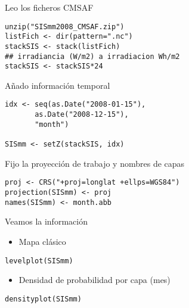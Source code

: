 \documentclass[xcolor={usenames,svgnames,dvipsnames}]{beamer}
\begin{document}
\begin{frame}[fragile,label=sec-2-1]{Leo los ficheros CMSAF}
 \lstset{language=R,numbers=none}
\begin{lstlisting}
unzip("SISmm2008_CMSAF.zip")
listFich <- dir(pattern=".nc")
stackSIS <- stack(listFich)
## irradiancia (W/m2) a irradiacion Wh/m2
stackSIS <- stackSIS*24
\end{lstlisting}
\end{frame}
\begin{frame}[fragile,label=sec-2-2]{Añado información temporal}
 \lstset{language=R,numbers=none}
\begin{lstlisting}
idx <- seq(as.Date("2008-01-15"),
	   as.Date("2008-12-15"),
	   "month")

SISmm <- setZ(stackSIS, idx)
\end{lstlisting}
\end{frame}
\begin{frame}[fragile,label=sec-2-3]{Fijo la proyección de trabajo y nombres de capas}
 \lstset{language=R,numbers=none}
\begin{lstlisting}
proj <- CRS("+proj=longlat +ellps=WGS84")
projection(SISmm) <- proj
names(SISmm) <- month.abb
\end{lstlisting}
\end{frame}
\begin{frame}[fragile,label=sec-2-4]{Veamos la información}
 \begin{itemize}
\item Mapa clásico
\end{itemize}
\lstset{language=R,numbers=none}
\begin{lstlisting}
levelplot(SISmm)
\end{lstlisting}
\begin{itemize}
\item Densidad de probabilidad por capa (mes)
\end{itemize}
\lstset{language=R,numbers=none}
\begin{lstlisting}
densityplot(SISmm)
\end{lstlisting}
\end{frame}
\end{document}
